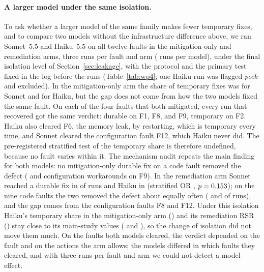 \begin{table}[t]
\centering\small
\caption{Action-appropriateness match (AAM) of the free arm.}\label{tab:aam}
\fittable{}
\end{table}

\begin{table}[t]
\centering\scriptsize
\caption{Follow-up under one isolation level: Claude Sonnet~5.5 and Haiku~5.5 on the twelve faults, three runs per fault
and arm, with the final isolation of Section~\ref{sec:leakage} (peek runs excluded). 95\% CIs from a bootstrap over
faults.}\label{tab:wp4}
\fittable{}
\end{table}

\paragraph{A larger model under the same isolation.} To ask whether a larger model of the same family makes fewer
temporary fixes, and to compare two models without the infrastructure difference above, we ran Sonnet~5.5 and Haiku~5.5 on
all twelve faults in the mitigation-only and remediation arms, three runs per fault and arm (\numwpfourRunsSonnet{} runs
per model), under the final isolation level of Section~\ref{sec:leakage}, with the protocol and the primary test fixed in
the log before the runs (Table~\ref{tab:wp4}; one Haiku run was flagged \emph{peek} and excluded). In the mitigation-only
arm the share of temporary fixes was \numwpfourShareMitSonnet{} for Sonnet and \numwpfourShareMitHaikuV{} for Haiku, but
the gap does not come from how the two models fixed the same fault. On each of the four faults that both mitigated, every
run that recovered got the same verdict: durable on F1, F8, and F9, temporary on F2. Haiku also cleared F6, the memory leak, by restarting,
which is temporary every time, and Sonnet cleared the configuration fault F12, which Haiku never did. The pre-registered
stratified test of the temporary share is therefore undefined, because no fault varies within it. The mechanism audit
repeats the main finding for both models: no mitigation-only durable fix on a code fault removed the defect
(\numwpfourCfgWkMitSonnet{} and \numwpfourCfgWkMitHaikuV{} configuration workarounds on F9). In the remediation arm Sonnet
reached a durable fix in \numwpfourRsrRemSonnet{} of runs and Haiku in \numwpfourRsrRemHaikuV{} (stratified OR
\numwpfourRealOrRem, $p=0.153$); on the nine code faults the two removed the defect about equally often
(\numwpfourCodeFixRemSonnet{} and \numwpfourCodeFixRemHaikuV{} of runs), and the gap comes from the configuration faults
F8 and F12. Under this isolation Haiku's temporary share in the mitigation-only arm (\numwpfourShareMitHaikuV) and its
remediation RSR (\numwpfourRsrRemHaikuV) stay close to its main-study values (\numwpfourShareMitHaikuThree{} and
\numwpfourRsrRemHaikuThree), so the change of isolation did not move them much. On the faults both models cleared, the
verdict depended on the fault and on the actions the arm allows; the models differed in which faults they cleared, and
with three runs per fault and arm we could not detect a model effect.


